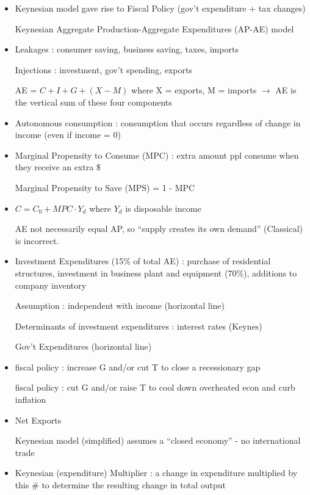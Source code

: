 \documentclass{article}
\begin{document}
\begin{itemize}
\item Keynesian model gave rise to Fiscal Policy (gov't expenditure + tax changes)

Keynesian Aggregate Production-Aggregate Expenditures (AP-AE) model


\item Leakages : consumer saving, business saving, taxes, imports

Injections : investment, gov't spending, exports

AE = $C + I + G + (X - M)$ where X = exports, M = imports $\rightarrow$ AE is the vertical sum of these four components


\item Autonomous consumption : consumption that occurs regardless of change in income (even if income = 0)

\item Marginal Propensity to Consume (MPC) : extra amount ppl consume when they receive an extra \$

Marginal Propensity to Save (MPS) = 1 - MPC

\item $C = C_0 + MPC \cdot Y_d$ where $Y_d$ is disposable income

AE not necessarily equal AP, so ``supply creates its own demand'' (Classical) is incorrect.

\item Investment Expenditures (15\% of total AE) : purchase of residential structures, investment in business plant and equipment (70\%), additions to company inventory

Assumption : independent with income (horizontal line)

Determinants of investment expenditures : interest rates (Keynes)

Gov't Expenditures (horizontal line)


\item {} fiscal policy : increase G and/or cut T to close a recessionary gap

 fiscal policy : cut G and/or raise T to cool down overheated econ and curb inflation

\item Net Exports

Keynesian model (simplified) assumes a ``closed economy'' - no international trade


\item Keynesian (expenditure) Multiplier : a change in expenditure multiplied by this \# to determine the resulting change in total output


\end{itemize}
\end{document}
